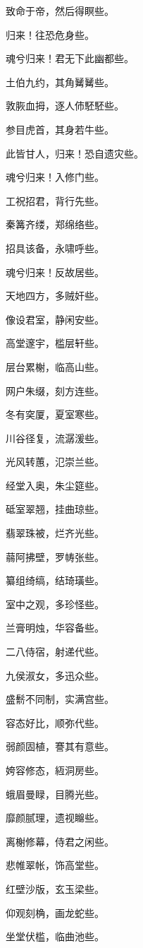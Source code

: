 \documentclass[12pt,a4paper]{ctexbook}
\begin{document}
致命于帝，然后得瞑些。\par
归来！往恐危身些。\par
魂兮归来！君无下此幽都些。\par
土伯九约，其角觺觺些。\par
敦脄血拇，逐人伂駓駓些。\par
参目虎首，其身若牛些。\par
此皆甘人，归来！恐自遗灾些。\par
魂兮归来！入修门些。\par
工祝招君，背行先些。\par
秦篝齐缕，郑绵络些。\par
招具该备，永啸呼些。\par
魂兮归来！反故居些。\par
天地四方，多贼奸些。\par
像设君室，静闲安些。\par
高堂邃宇，槛层轩些。\par
层台累榭，临高山些。\par
网户朱缀，刻方连些。\par
冬有穾厦，夏室寒些。\par
川谷径复，流潺湲些。\par
光风转蕙，氾崇兰些。\par
经堂入奥，朱尘筵些。\par
砥室翠翘，挂曲琼些。\par
翡翠珠被，烂齐光些。\par
蒻阿拂壁，罗帱张些。\par
纂组绮缟，结琦璜些。\par
室中之观，多珍怪些。\par
兰膏明烛，华容备些。\par
二八侍宿，射递代些。\par
九侯淑女，多迅众些。\par
盛鬋不同制，实满宫些。\par
容态好比，顺弥代些。\par
弱颜固植，謇其有意些。\par
姱容修态，絚洞房些。\par
蛾眉曼睩，目腾光些。\par
靡颜腻理，遗视矊些。\par
离榭修幕，侍君之闲些。\par
悲帷翠帐，饰高堂些。\par
红壁沙版，玄玉梁些。\par
仰观刻桷，画龙蛇些。\par
坐堂伏槛，临曲池些。\par
\end{document}
